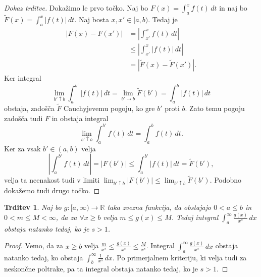 \documentclass[10pt, a4paper]{article}
\newtheorem{trditev}[izr]{Trditev}
\newenvironment{noticeC}{%
  \tcolorbox[%
  notitle,
  empty,
  enhanced,  %
  breakable,
  coltext=black, 
  fontupper=\rmfamily,
  noparskip,
  sharp corners,
  boxrule=-1pt,  %
  frame hidden,
  left=7pt,  %
  right=7pt,
  top=5pt,
  bottom=5pt,
  before skip=2.5ex plus 2pt,
  after skip=2.5ex plus 2pt,
  overlay unbroken and last={%
  },
  ]}
{\endtcolorbox}
\newenvironment{dokaz}%
  {\begin{noticeC}\begin{proof}}%
  {\end{proof}\end{noticeC}}
\newcommand{\R}{\mathbb {R}}
\newcommand{\limf}[3]{\lim_{#1 \to #2} {#3}}
\newcommand{\llimf}[3]{\lim_{#1 \uparrow #2} {#3}}
\begin{document}
\begin{dokaz}[Dokaz trditve]
    Dokažimo le prvo točko.
        Naj bo $F(x) = \int_a ^x f(t)\,dt$ in naj bo $\tilde{F}(x) = \int_a ^x |f(t)|\,dt$.
        Naj bosta $x, x' \in [a, b)$. Tedaj je 
        \begin{align*}
            |F(x) - F(x')| &= \left| \int_{x'} ^x f(t)\,dt \right|\\
            &\leq \left| \int_{x'} ^x |f(t)|\,dt \right|\\
            &= |\tilde{F}(x) - \tilde{F}(x')|.
        \end{align*}
        Ker integral $$\llimf{b'}{b}{\int_a ^{b'} |f(t)|\,dt} = \limf{b'}{b}{\tilde{F}(b')} = \int_a ^b |f(t)|\,dt$$
        obstaja, zadošča $\tilde{F}$ Cauchyjevemu pogoju, ko gre $b'$ proti $b$. 
        Zato temu pogoju zadošča tudi $F$ in obstaja integral $$\llimf{b'}{b}{\int_a ^{b'} f(t)\,dt} = \int_a ^b f(t)\,dt.$$
        Ker za vsak $b' \in (a, b)$ velja $$\left| \int_a ^{b'} f(t)\,dt \right| = |F(b')| \leq \int_a ^{b'} |f(t)|\,dt = \tilde{F} (b'),$$
        velja ta neenakost tudi v limiti $\llimf{b'}{b}{|F(b')|} \leq \llimf{b'}{b}{\tilde{F}(b')}$.
        Podobno dokažemo tudi drugo točko.
\end{dokaz}

\begin{trditev}
    Naj bo $g: [a, \infty) \rightarrow \R$ taka zvezna funkcija, da obstajajo $0 < a \leq b$ in $0 < m \leq M < \infty$, da za $\forall x \geq b$ velja $m \leq g(x) \leq M$.
    Tedaj integral $\int_a ^\infty \frac{g(x)}{x^s}\,dx$ obstaja natanko tedaj, ko je $s > 1$.
\end{trditev}

\begin{dokaz}
    Vemo, da za $x \geq b$ velja $\frac{m}{x^s} \leq \frac{g(x)}{x^s} \leq \frac{M}{x^s}$.
    Integral $\int_a ^\infty \frac{g(x)}{x^s}\,dx$ obstaja natanko tedaj, ko obstaja $\int_b ^\infty \frac{1}{x^s}\,dx$.
    Po primerjalnem kriteriju, ki velja tudi za neskončne poltrake, pa ta integral obstaja natanko tedaj, ko je $s > 1$.
\end{dokaz}
\end{document}
